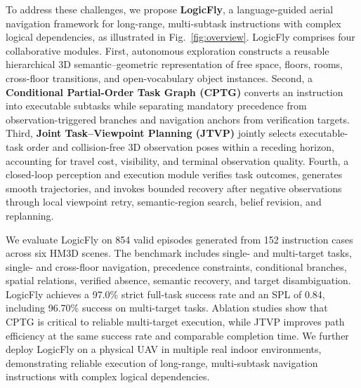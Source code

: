 \documentclass[letterpaper,10pt,journal]{IEEEtran}
\begin{document}
To address these challenges, we propose \textbf{LogicFly}, a language-guided aerial navigation framework for long-range, multi-subtask instructions with complex logical dependencies, as illustrated in Fig.~\ref{fig:overview}. LogicFly comprises four collaborative modules. First, autonomous exploration constructs a reusable hierarchical 3D semantic--geometric representation of free space, floors, rooms, cross-floor transitions, and open-vocabulary object instances. Second, a \textbf{Conditional Partial-Order Task Graph (CPTG)} converts an instruction into executable subtasks while separating mandatory precedence from observation-triggered branches and navigation anchors from verification targets. Third, \textbf{Joint Task--Viewpoint Planning (JTVP)} jointly selects executable-task order and collision-free 3D observation poses within a receding horizon, accounting for travel cost, visibility, and terminal observation quality. Fourth, a closed-loop perception and execution module verifies task outcomes, generates smooth trajectories, and invokes bounded recovery after negative observations through local viewpoint retry, semantic-region search, belief revision, and replanning.

We evaluate LogicFly on 854 valid episodes generated from 152 instruction cases across six HM3D scenes. The benchmark includes single- and multi-target tasks, single- and cross-floor navigation, precedence constraints, conditional branches, spatial relations, verified absence, semantic recovery, and target disambiguation. LogicFly achieves a 97.0\% strict full-task success rate and an SPL of 0.84, including 96.70\% success on multi-target tasks. Ablation studies show that CPTG is critical to reliable multi-target execution, while JTVP improves path efficiency at the same success rate and comparable completion time. We further deploy LogicFly on a physical UAV in multiple real indoor environments, demonstrating reliable execution of long-range, multi-subtask navigation instructions with complex logical dependencies.
\end{document}

